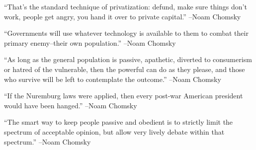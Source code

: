 \documentclass{article}%
\begin{document}
\linebreak%
\vspace{1mm}%
\begin{minipage}{\textwidth}%
\flushleft%
“That's the standard technique of privatization: defund, make sure things don't work, people get angry, you hand it over to private capital.”%
\linebreak%
\vspace{1mm}%
–Noam Chomsky%
\linebreak%
\vspace{1mm}%
\end{minipage}%
\linebreak%
\vspace{1mm}%
\begin{minipage}{\textwidth}%
\flushleft%
“Governments will use whatever technology is available to them to combat their primary enemy–their own population.”%
\linebreak%
\vspace{1mm}%
–Noam Chomsky%
\linebreak%
\vspace{1mm}%
\end{minipage}%
\linebreak%
\vspace{1mm}%
\begin{minipage}{\textwidth}%
\flushleft%
“As long as the general population is passive, apathetic, diverted to consumerism or hatred of the vulnerable, then the powerful can do as they please, and those who survive will be left to contemplate the outcome.”%
\linebreak%
\vspace{1mm}%
–Noam Chomsky%
\linebreak%
\vspace{1mm}%
\end{minipage}%
\linebreak%
\vspace{1mm}%
\begin{minipage}{\textwidth}%
\flushleft%
“If the Nuremburg laws were applied, then every post{-}war American president would have been hanged.”%
\linebreak%
\vspace{1mm}%
–Noam Chomsky%
\linebreak%
\vspace{1mm}%
\end{minipage}%
\linebreak%
\vspace{1mm}%
\begin{minipage}{\textwidth}%
\flushleft%
“The smart way to keep people passive and obedient is to strictly limit the spectrum of acceptable opinion, but allow very lively debate within that spectrum.”%
\linebreak%
\vspace{1mm}%
–Noam Chomsky%
\linebreak%
\vspace{1mm}%
\end{minipage}%
\end{document}
